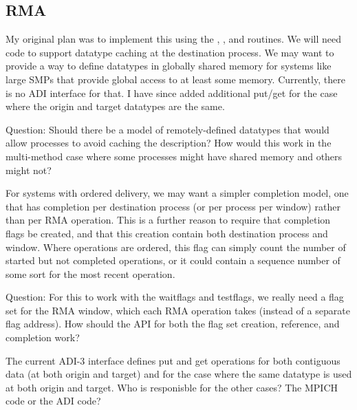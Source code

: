 \documentclass{article}
\begin{document}
\subsubsection{}
\subsubsection{}
\subsubsection{}

\subsection{RMA}

My original plan was to implement this using the ,
,  and  routines.  We
will need code to support datatype caching at the destination process.
We may want to provide a way to define datatypes in globally shared
memory for systems like large SMPs that provide global access to at
least some memory.  Currently, there is no ADI interface for that.
I have since added additional put/get for the case where the origin
and target datatypes are the same.  

Question:  Should there be a model of remotely-defined datatypes that
would allow processes to avoid caching the description?  How would
this work in the multi-method case where some processes might have
shared memory and others might not?

For systems with ordered delivery, we may want a simpler completion
model, one that has completion per destination process (or per process
per window) rather than per RMA operation.  This is a further reason
to require that completion flags be created, and that this creation
contain both destination process and window.  Where operations are
ordered, this flag can simply count the number of started but not
completed operations, or it could contain a sequence number of some
sort for the most recent operation.  

Question:  For this to work with the waitflags and testflags, we
really need a flag set for the RMA window, which each RMA operation
takes (instead of a separate flag address).  How should the API for
both the flag set creation, reference, and completion work?  

The current ADI-3 interface defines put and get operations for both
contiguous data (at both origin and target) and for the case where the
same datatype is used at both origin and target.  Who is responisble
for the other cases?  The MPICH code or the ADI code?
\end{document}
